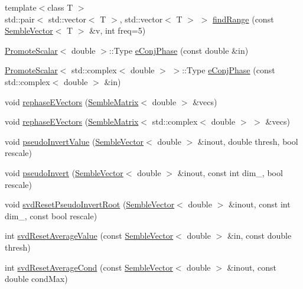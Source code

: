 \begin{DoxyCompactItemize}
\item 
{\footnotesize template$<$class T $>$ }\\std\+::pair$<$ std\+::vector$<$ T $>$, std\+::vector$<$ T $>$ $>$ \mbox{\hyperlink{namespaceSEMBLE_a2b44000f5384f9856e4274280a6ec702}{find\+Range}} (const \mbox{\hyperlink{structSEMBLE_1_1SembleVector}{Semble\+Vector}}$<$ T $>$ \&v, int freq=5)
\item 
\mbox{\hyperlink{structSEMBLE_1_1PromoteScalar}{Promote\+Scalar}}$<$ double $>$\+::Type \mbox{\hyperlink{namespaceSEMBLE_a58b3ad4ba97955f042eae4be16a29b21}{e\+Conj\+Phase}} (const double \&in)
\item 
\mbox{\hyperlink{structSEMBLE_1_1PromoteScalar}{Promote\+Scalar}}$<$ std\+::complex$<$ double $>$ $>$\+::Type \mbox{\hyperlink{namespaceSEMBLE_aab16747d17287c71280164a3a824f77f}{e\+Conj\+Phase}} (const std\+::complex$<$ double $>$ \&in)
\item 
void \mbox{\hyperlink{namespaceSEMBLE_af53ad989d18f8aab4666dab37495120d}{rephase\+E\+Vectors}} (\mbox{\hyperlink{structSEMBLE_1_1SembleMatrix}{Semble\+Matrix}}$<$ double $>$ \&vecs)
\item 
void \mbox{\hyperlink{namespaceSEMBLE_a8e644f5b26af596a30e065f17bededc1}{rephase\+E\+Vectors}} (\mbox{\hyperlink{structSEMBLE_1_1SembleMatrix}{Semble\+Matrix}}$<$ std\+::complex$<$ double $>$ $>$ \&vecs)
\item 
void \mbox{\hyperlink{namespaceSEMBLE_aeba19d69ca776dd563e7ccb9975fa4c7}{pseudo\+Invert\+Value}} (\mbox{\hyperlink{structSEMBLE_1_1SembleVector}{Semble\+Vector}}$<$ double $>$ \&inout, double thresh, bool rescale)
\item 
void \mbox{\hyperlink{namespaceSEMBLE_aea218466ee1ef3d98f79fcd3cf6d0c49}{pseudo\+Invert}} (\mbox{\hyperlink{structSEMBLE_1_1SembleVector}{Semble\+Vector}}$<$ double $>$ \&inout, const int dim\+\_\+, bool rescale)
\item 
void \mbox{\hyperlink{namespaceSEMBLE_a609d3c49c36408c280b11e2b5a8a5395}{svd\+Reset\+Pseudo\+Invert\+Root}} (\mbox{\hyperlink{structSEMBLE_1_1SembleVector}{Semble\+Vector}}$<$ double $>$ \&inout, const int dim\+\_\+, const bool rescale)
\item 
int \mbox{\hyperlink{namespaceSEMBLE_a5a99b05753b531606137646e96ee12ff}{svd\+Reset\+Average\+Value}} (const \mbox{\hyperlink{structSEMBLE_1_1SembleVector}{Semble\+Vector}}$<$ double $>$ \&in, const double thresh)
\item 
int \mbox{\hyperlink{namespaceSEMBLE_a63cc1ba6c9e1c57e90030d6128a4642a}{svd\+Reset\+Average\+Cond}} (const \mbox{\hyperlink{structSEMBLE_1_1SembleVector}{Semble\+Vector}}$<$ double $>$ \&inout, const double cond\+Max)

\end{DoxyCompactItemize}
